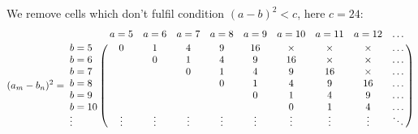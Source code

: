 \documentclass[11pt]{article}
\begin{document}
We remove cells which don't fulfil condition $(a-b)^2 < c$, here $c=24$:
\begin {equation}\label{E:21}
(a_m - b_n)^2 =\bordermatrix{~ & a=5 & a=6 & a=7 & a=8 & a=9 & a=10 & a=11 & a=12 & \hdots\cr
b=5  & 0 & 1 & 4 &  9 & 16 & \times & \times & \times & \hdots \cr    
b=6  &   & 0 & 1 &  4 &  9 & 16 & \times & \times & \hdots \cr    
b=7  &   &   & 0 &  1 &  4 &  9 & 16 & \times & \hdots \cr    
b=8  &   &   &   &  0 &  1 &  4 &  9 & 16 & \hdots \cr    
b=9  &   &   &   &    &  0 &  1 &  4 &  9 & \hdots \cr    
b=10 &   &   &   &    &    &  0 &  1 &  4 & \hdots \cr    
\vdots & \vdots & \vdots & \vdots & \vdots & \vdots & \vdots & \vdots & \vdots & \ddots \cr}
\end {equation}
\end{document}
